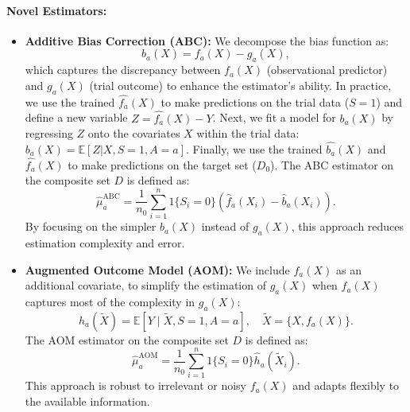 \documentclass[12pt, oneside]{amsart}
\theoremstyle{definition}
\theoremstyle{remark}
\numberwithin{equation}{section}
\begin{document}
\paragraph{Novel Estimators:}
\begin{itemize}
    \item \textbf{Additive Bias Correction (ABC):} We decompose the bias function as:
    $$
    b_a(X) = f_a(X) - g_a(X),
    $$
    which captures the discrepancy between $f_a(X)$ (observational predictor) and $g_a(X)$ (trial outcome) to enhance the estimator's ability. In practice, we use the trained $\hat{f_a}(X)$ to make predictions on the trial data ($S = 1$) and define a new variable $Z = \hat{f_a}(X) - Y$. Next, we fit a model for $b_a(X)$ by regressing $Z$ onto the covariates $X$ within the trial data: $b_a(X) = \mathbb{E}[Z|X, S = 1, A = a]$. Finally, we use the trained $\hat{b_a}(X)$ and $\hat{f_a}(X)$ to make predictions on the target set ($D_0$). The ABC estimator on the composite set $D$ is defined as:
    $$
    \hat{\mu}_a^{\text{ABC}} = \frac{1}{n_0} \sum_{i=1}^{n} 1 \{S_i = 0\} \left( \hat{f}_a(X_i) - \hat{b}_a(X_i) \right).
    $$
    By focusing on the simpler $b_a(X)$ instead of $g_a(X)$, this approach reduces estimation complexity and error.

    \item \textbf{Augmented Outcome Model (AOM):} We include $f_a(X)$ as an additional covariate, to simplify the estimation of $g_a(X)$ when $f_a(X)$ captures most of the complexity in $g_a(X)$:
    $$
    h_a(\tilde{X}) = \mathbb{E}[Y \mid \tilde{X}, S = 1, A = a], \quad \tilde{X} = \{X, f_a(X)\}.
    $$
    The AOM estimator on the composite set $D$ is defined as:
    $$
    \hat{\mu}_a^{\text{AOM}} = \frac{1}{n_0} \sum_{i=1}^{n} 1 \{S_i = 0\} \hat{h}_a(\tilde{X}_i).
    $$
    This approach is robust to irrelevant or noisy $f_a(X)$ and adapts flexibly to the available information.
\end{itemize}
\end{document}
